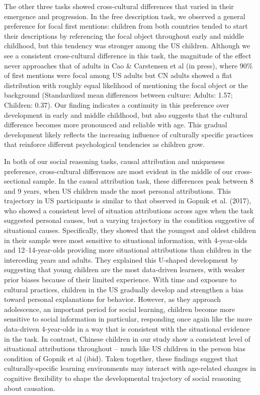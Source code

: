 \documentclass[10pt, letterpaper]{article}
\begin{document}
The other three tasks showed cross-cultural differences that varied in
their emergence and progression. In the free description task, we
observed a general preference for focal first mentions: children from
both countries tended to start their descriptions by referencing the
focal object throughout early and middle childhood, but this tendency
was stronger among the US children. Although we see a consistent
cross-cultural difference in this task, the magnitude of the effect
never approaches that of adults in Cao \& Carstensen et al (in press),
where 90\% of first mentions were focal among US adults but CN adults
showed a flat distribution with roughly equal likelihood of mentioning
the focal object or the background (Standardized mean differences
between culture: Adults: 1.57; Children: 0.37). Our finding indicates a
continuity in this preference over development in early and middle
childhood, but also suggests that the cultural difference becomes more
pronounced and reliable with age. This gradual development likely
reflects the increasing influence of culturally specific practices that
reinforce different psychological tendencies as children grow.

In both of our social reasoning tasks, causal attribution and uniqueness
preference, cross-cultural differences are most evident in the middle of
our cross-sectional sample. In the causal attribution task, these
differences peak between 8 and 9 years, when US children made the most
personal attributions. This trajectory in US participants is similar to
that observed in Gopnik et al. (2017), who showed a consistent level of
situation attributions across ages when the task suggested personal
causes, but a varying trajectory in the condition suggestive of
situational causes. Specifically, they showed that the youngest and
oldest children in their sample were most sensitive to situational
information, with 4-year-olds and 12--14-year-olds providing more
situational attributions than children in the interceding years and
adults. They explained this U-shaped development by suggesting that
young children are the most data-driven learners, with weaker prior
biases because of their limited experience. With time and exposure to
cultural practices, children in the US gradually develop and strengthen
a bias toward personal explanations for behavior. However, as they
approach adolescence, an important period for social learning, children
become more sensitive to social information in particular, responding
once again like the more data-driven 4-year-olds in a way that is
consistent with the situational evidence in the task. In contrast,
Chinese children in our study show a consistent level of situational
attributions throughout -- much like US children in the person bias
condition of Gopnik et al (ibid). Taken together, these findings suggest
that culturally-specific learning environments may interact with
age-related changes in cognitive flexibility to shape the developmental
trajectory of social reasoning about causation.
\end{document}
